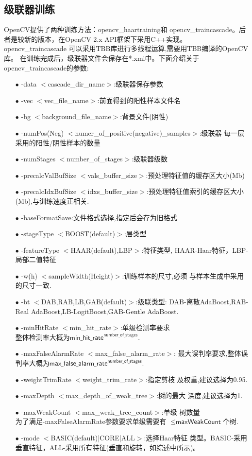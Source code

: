 \subsection{级联器训练}
OpenCV提供了两种训练方法：\textsf{opencv\_haartraining}和
\textsf{opencv\_traincascade}。后者是较新的版本，在OpenCV 2.x
API框架下采用C++实现。\textsf{opencv\_traincascade}
可以采用TBB库进行多线程运算,需要用TBB编译的OpenCV库。
在训练完成后，级联器文件会保存在\textsf{*.xml}中。下面介绍关于
\textsf{opencv\_traincascade}的参数:
\begin{enumerate}
\item[$\bullet$]\textsf{-data $<$cascade\_dir\_name$>$}:级联器保存参数
\item[$\bullet$]\textsf{-vec $<$vec\_file\_name$>$}:前面得到的阳性样本文件名
\item[$\bullet$]\textsf{-bg $<$background\_file\_name$>$}:背景文件(阴性)
\item[$\bullet$]
\textsf{-numPos(Neg) $<$numer\_of\_positive(negative)\_samples$>$}:级联器
每一层采用的阳性/阴性样本的数量
\item[$\bullet$]\textsf{-numStages $<$number\_of\_stages$>$}:级联器级数
\item[$\bullet$]\textsf{-precalcValBufSize $<$vals\_buffer\_size$>$}:预处理特征值的缓存区大小(Mb)
\item[$\bullet$]\textsf{-precalcIdxBufSize $<$idxs\_buffer\_size$>$}:预处理特征值索引的缓存区大小(Mb),与训练速度正相关.
\item[$\bullet$]\textsf{-baseFormatSave}:文件格式选择,指定后会存为旧格式
\item[$\bullet$]\textsf{-stageType $<$BOOST(default)$>$}:层类型
\item[$\bullet$]\textsf{-featureType $<$HAAR(default),LBP$>$}:特征类型,
HAAR-Haar特征，LBP-局部二值特征
\item[$\bullet$]\textsf{-w(h) $<$sampleWidth(Height)$>$}:训练样本的尺寸,必须
与样本生成中采用的尺寸一致.
\item[$\bullet$]\textsf{-bt $<${DAB,RAB,LB,GAB(default)}$>$}:级联类型:
DAB-离散AdaBoost,RAB-Real AdaBoost,LB-LogitBoost,GAB-Gentle AdaBoost.
\item[$\bullet$]\textsf{-minHitRate $<$min\_hit\_rate$>$}:单级检测率要求\\
    整体检测率大概为$\textsf{min\_hit\_rate}^\textsf{number\_of\_stages}$.
\item[$\bullet$]\textsf{-maxFalseAlarmRate $<$max\_false\_alarm\_rate$>$}:
    最大误判率要求,整体误判率大概为$\textsf{max\_false\_alarm\_rate}^\textsf{number\_of\_stages}$.
\item[$\bullet$]\textsf{-weightTrimRate $<$weight\_trim\_rate$>$}:指定剪枝
及权重,建议选择为0.95.
\item[$\bullet$]\textsf{-maxDepth $<$max\_depth\_of\_weak\_tree$>$}:树的最大
深度,建议选择为1.
\item[$\bullet$]\textsf{-maxWeakCount $<$max\_weak\_tree\_count$>$}:单级
树数量\\为了满足\textsf{-maxFalseAlarmRate}参数要求单级需要有
$\leq{}\textsf{maxWeakCount}$个树.
\item[$\bullet$]\textsf{-mode $<$BASIC(default)|CORE|ALL$>$}:选择Haar特征
类型。BASIC-采用垂直特征，ALL-采用所有特征(垂直和旋转，如综述\cite{survey}中所示)。
\end{enumerate}
